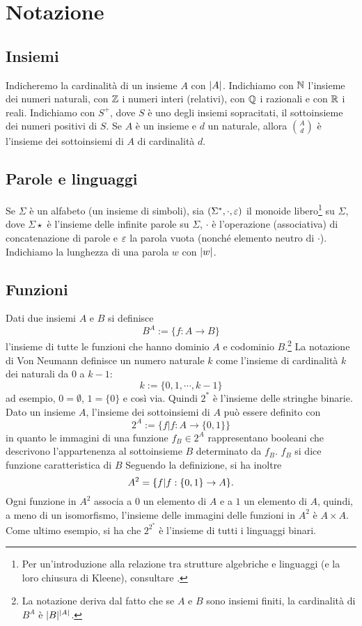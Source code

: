 \section*{Notazione}


\subsection*{Insiemi}
Indicheremo la cardinalità di un insieme $A$ con $| A |$.
Indichiamo con $\mathbb N$ l'insieme dei numeri naturali, con $\mathbb Z$ i numeri interi (relativi), con $\mathbb Q$ i razionali e con $\mathbb R$ i reali.
Indichiamo con $S^+$, dove $S$ è uno degli insiemi sopracitati, il sottoinsieme dei numeri positivi di $S$.
Se $A$ è un insieme e $d$ un naturale, allora $\binom{A}{d}$ è l'insieme dei sottoinsiemi di $A$ di cardinalità $d$.


\subsection*{Parole e linguaggi}
Se $\Sigma$ è un alfabeto (un insieme di simboli), sia $(\Sigma^*, \cdot, \varepsilon)$ il monoide libero\footnote{Per un'introduzione alla relazione tra strutture algebriche e linguaggi (e la loro	chiusura di Kleene), consultare \cite{Sakarovitch:09:automata}.} su $\Sigma$, dove $\Sigma\star$ è l'insieme delle infinite parole su $\Sigma$, $\cdot$ è l'operazione (associativa) di concatenazione di parole e $\varepsilon$ la parola vuota (nonché elemento neutro di $\cdot$).
Indichiamo la lunghezza di una parola $w$ con $|w|$.


\subsection*{Funzioni}
Dati due insiemi $A$ e $B$ si definisce
\begin{equation*}
	B^A := \{f : A \to B\}
\end{equation*}
l'insieme di tutte le funzioni che hanno dominio $A$ e codominio $B$.\footnote{La notazione deriva dal fatto che se $A$ e $B$ sono insiemi finiti, la cardinalità di $B^A$ è $| B |^{| A |}$.}
La notazione di Von Neumann definisce un numero naturale $k$ come l'insieme di cardinalità $k$ dei naturali da $0$ a $k-1$:
$$
	k := \{0,1,\cdots,k-1\}
$$
ad esempio, $0 = \emptyset$, $1 = \{0\}$ e così via. Quindi $2^*$ è l'insieme delle stringhe binarie.
Dato un insieme $A$, l'insieme dei sottoinsiemi di $A$ può essere definito con
$$
	2^A := \{f | f: A \to \{0,1\}\}
$$
in quanto le immagini di una funzione $f_B\in2^A$ rappresentano booleani che descrivono l'appartenenza al sottoinsieme $B$ determinato da $f_B$. $f_B$ si dice funzione caratteristica di $B$
Seguendo la definizione, si ha inoltre
$$
	A^2 = \{f| f: \{0,1\} \to A\}\text.
$$
Ogni funzione in $A^2$ associa a $0$ un elemento di $A$ e a $1$ un elemento di $A$, quindi, a meno di un isomorfismo, l'insieme delle immagini delle funzioni in $A^2$ è $A \times A$.
Come ultimo esempio, si ha che $2^{2^*}$ è l'insieme di tutti i linguaggi binari.


